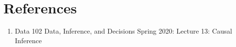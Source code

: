 \section{References}
\begin{enumerate}
    \item Data 102 Data, Inference, and Decisions Spring 2020: Lecture 13: Causal Inference
\end{enumerate}